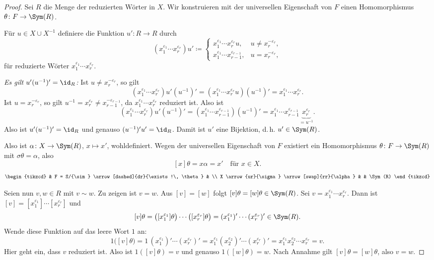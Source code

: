 \documentclass[11pt]{article}
\begin{document}
\begin{proof}
  Sei $R$ die Menge der reduzierten Wörter in $X$. Wir konstruieren mit der universellen Eigenschaft von $F$ einen Homomorphismus $\theta\colon F \to \Sym(R)$.

  Für $u \in X \cup X^{-1}$ definiere die Funktion $u'\colon R \to R$ durch
  \[
    (x_1^{\varepsilon_1} \cdots x_r^{\varepsilon_r})u' \coloneqq
    \begin{cases}
      x_1^{\varepsilon_1} \cdots x_r^{\varepsilon_r} u, & u \neq x_r^{-\varepsilon_r}, \\
      x_1^{\varepsilon_1} \cdots x_{r-1}^{\varepsilon_{r-1}}, & u = x_r^{-\varepsilon_r},
    \end{cases}
  \]
  für reduzierte Wörter $x_1^{\varepsilon_1} \cdots x_r^{\varepsilon_r}$.

  \textit{Es gilt $u'(u^{-1})' = \id_R$:} Ist $u \neq x_r^{-\varepsilon_r}$, so gilt
  \[ (x_1^{\varepsilon_1} \cdots x_r^{\varepsilon_r})u'(u^{-1})' = (x_1^{\varepsilon_1} \cdots x_r^{\varepsilon_r} u)(u^{-1})' = x_1^{\varepsilon_1} \cdots x_r^{\varepsilon_r}. \]
  Ist $u = x_r^{-\varepsilon_r}$, so gilt $u^{-1} = x_r^{\varepsilon_r} \neq x_{r-1}^{-\varepsilon_{r-1}}$, da $x_1^{\varepsilon_1} \cdots x_r^{\varepsilon_r}$ reduziert ist. Also ist
  \[ (x_1^{\varepsilon_1} \cdots x_r^{\varepsilon_r})u'(u^{-1})' = (x_1^{\varepsilon_1} \cdots x_{r-1}^{\varepsilon_{r-1}})(u^{-1})' = x_1^{\varepsilon_1} \cdots x_{r-1}^{\varepsilon_{r-1}} \underbrace{x_r^{\varepsilon_r}}_{= u^{-1}}. \]
  Also ist $u'(u^{-1})' = \id_R$ und genauso $(u^{-1})'u' = \id_R$. Damit ist $u'$ eine Bijektion, d.\,h. $u' \in \Sym(R)$.

  Also ist $\alpha\colon X \to \Sym(R)$, $x \mapsto x'$, wohldefiniert. Wegen der universellen Eigenschaft von $F$ existiert ein Homomorphismus $\theta\colon F \to \Sym(R)$ mit $\sigma\theta = \alpha$, also
  \[ [x]\theta = x\alpha = x' \quad \text{für } x \in X. \]
  \[
    \begin{tikzcd}
      & F = S/{\sim} \arrow[dashed]{dr}{\exists!\, \theta} & \\
      X \arrow{ur}{\sigma} \arrow[swap]{rr}{\alpha} & & \Sym(R)
    \end{tikzcd}
  \]

  Seien nun $v, w \in R$ mit $v \sim w$. Zu zeigen ist $v = w$. Aus $[v] = [w]$ folgt $[v]\theta = [w]\theta \in \Sym(R)$. Sei $v = x_1^{\varepsilon_1} \cdots x_r^{\varepsilon_r}$. Dann ist $[v] = [x_1^{\varepsilon_1}] \cdots [x_r^{\varepsilon_r}]$ und
  \[ [v]\theta = \bigl([x_1^{\varepsilon_1}]\theta\bigr) \cdots \bigl([x_r^{\varepsilon_r}]\theta\bigr) = (x_1^{\varepsilon_1})' \cdots (x_r^{\varepsilon_r})' \in \Sym(R). \]
  Wende diese Funktion auf das leere Wort $1$ an:
  \[ 1\bigl([v]\theta\bigr) = 1\,(x_1^{\varepsilon_1})' \cdots (x_r^{\varepsilon_r})' = x_1^{\varepsilon_1} (x_2^{\varepsilon_2})' \cdots (x_r^{\varepsilon_r})' = x_1^{\varepsilon_1} x_2^{\varepsilon_2} \cdots x_r^{\varepsilon_r} = v. \]
  Hier geht ein, dass $v$ reduziert ist. Also ist $1([v]\theta) = v$ und genauso $1([w]\theta) = w$. Nach Annahme gilt $[v]\theta = [w]\theta$, also $v = w$.
\end{proof}
\end{document}
